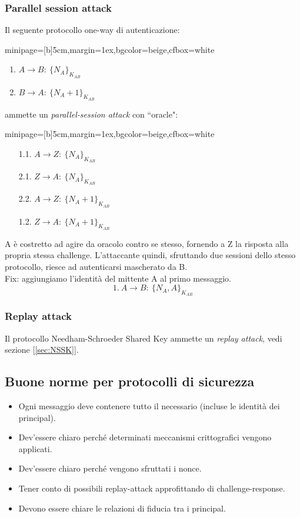\documentclass[a4paper, 11pt, twoside, openright, fleqn]{report}
\newcommand{\fromto}[2]{#1\rightarrow #2\!:\ }
\newenvironment{colbox}[2]%
{%
	\par\noindent\hspace{10pt}
	\begin{adjustbox}{minipage=[b]{#2},margin=1ex,bgcolor=#1,cfbox=white}
}{%
	\end{adjustbox}\newline%
}
\begin{document}
\subsubsection{Parallel session attack}
Il seguente protocollo one-way di autenticazione:
\begin{colbox}{beige}{5cm}
	\begin{enumerate}
		\item $\fromto{A}{B}\{N_A\}_{K_{AB}}$
		\item $\fromto{B}{A}\{N_A+1\}_{K_{AB}}$
	\end{enumerate}
\end{colbox}
ammette un \emph{parallel-session attack} con ``oracle":
\begin{colbox}{beige}{5cm}
	\begin{enumerate}
		\item[1.1.] $\fromto{A}{Z}\{N_A\}_{K_{AB}}$
		\item[2.1.] $\fromto{Z}{A}\{N_A\}_{K_{AB}}$
		\item[2.2.] $\fromto{A}{Z}\{N_A+1\}_{K_{AB}}$
		\item[1.2.] $\fromto{Z}{A}\{N_A+1\}_{K_{AB}}$
	\end{enumerate}
\end{colbox}
A è costretto ad agire da oracolo contro se stesso, fornendo a Z la risposta alla propria stessa challenge. L'attaccante quindi, sfruttando due sessioni dello stesso protocollo, riesce ad autenticarsi mascherato da B.\\
Fix: aggiungiamo l'identità del mittente A al primo messaggio.
\begin{equation*}
	1.\ \fromto{A}{B}\{N_A,A\}_{K_{AB}}
\end{equation*}

\subsubsection{Replay attack}
Il protocollo Needham-Schroeder Shared Key ammette un \emph{replay attack}, vedi sezione [\ref{sec:NSSK}].

\subsection{Buone norme per protocolli di sicurezza}
\begin{itemize}
	\item Ogni messaggio deve contenere tutto il necessario (incluse le identità dei principal).
	\item Dev'essere chiaro perché determinati meccanismi crittografici vengono applicati.
	\item Dev'essere chiaro perché vengono sfruttati i nonce.
	\item Tener conto di possibili replay-attack approfittando di challenge-response.
	\item Devono essere chiare le relazioni di fiducia tra i principal.
\end{itemize}
\end{document}
